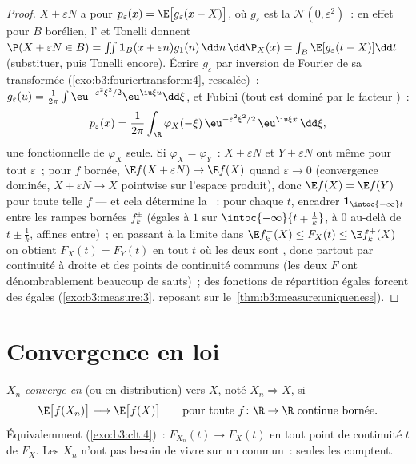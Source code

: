 \begin{proof}
$X + \varepsilon N$ a pour  $p_\varepsilon(x) =
\E\bigl[g_\varepsilon(x - X)\bigr]$, où $g_\varepsilon$ est
la  $\mathcal N(0, \varepsilon^2)$~: en effet pour
$B$ borélien, l' et Tonelli donnent $\P(X +
\varepsilon N \in B) = \int\!\!\int\mathbf 1_B(x +
\varepsilon n)g_1(n)\,\dd n\,\dd\P_X(x) =
\int_B\E[g_\varepsilon(t - X)]\dd t$ (substituer, puis
Tonelli encore). Écrire $g_\varepsilon$ par inversion de
Fourier de sa transformée
(\cref{exo:b3:fouriertransform:4}, rescalée)~:
$g_\varepsilon(u) = \frac1{2\pi}\int
\eu^{-\varepsilon^2\xi^2/2}\eu^{\iu\xi u}\dd\xi$, et Fubini
(tout est dominé par le facteur )~:
\[
p_\varepsilon(x) = \frac1{2\pi}\int_\R
\varphi_X(-\xi)\,\eu^{-\varepsilon^2\xi^2/2}\,
\eu^{\iu\xi x}\,\dd\xi ,
\]
une fonctionnelle de $\varphi_X$ seule. Si $\varphi_X =
\varphi_Y$~: $X + \varepsilon N$ et $Y + \varepsilon N$ ont
même  pour tout $\varepsilon$~; pour $f$  bornée,
$\E f(X + \varepsilon N) \to \E f(X)$ quand $\varepsilon \to
0$ (convergence dominée, $X + \varepsilon N \to X$
pointwise sur l'espace produit), donc $\E f(X) = \E f(Y)$
pour toute telle $f$ --- et cela détermine la ~: pour
chaque $t$, encadrer $\mathbf 1_{\intoc{-\infty}t}$ entre
les rampes  bornées $f_k^\pm$ (égales à $1$ sur
$\intoc{-\infty}{t \mp \frac1k}$, à $0$ au-delà de $t \pm
\frac1k$, affines entre)~; en passant à la limite dans $\E
f_k^-(X) \leq F_X(t) \leq \E f_k^+(X)$ on obtient $F_X(t)
= F_Y(t)$ en tout $t$ où les deux sont , donc
partout par continuité à droite et  des points de
continuité communs (les deux $F$ ont dénombrablement
beaucoup de sauts)~; des fonctions de répartition égales
forcent des  égales (\cref{exo:b3:measure:3}, reposant
sur le~\cref{thm:b3:measure:uniqueness}).
\end{proof}

\section{Convergence en loi}

\begin{definition}\label{def:b3:clt:cid}
$X_n$ \emph{converge en } (ou en distribution) vers $X$,
noté $X_n \Rightarrow X$, si
\[
\E\bigl[f(X_n)\bigr] \longrightarrow \E\bigl[f(X)\bigr]
\qquad\text{pour toute } f\colon\R\to\R \text{ continue
bornée}.
\]
Équivalemment (\cref{exo:b3:clt:4})~: $F_{X_n}(t) \to
F_X(t)$ en tout point de continuité $t$ de $F_X$. Les $X_n$
n'ont pas besoin de vivre sur un 
commun~: seules les  comptent.
\end{definition}


